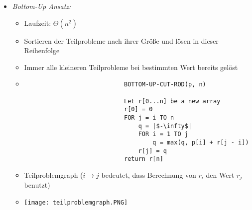\begin{itemize}
\begin{itemize}
\begin{itemize}
\begin{verbatim}
                            MEMOIZED-CUT-ROD-AUX(p, n, r)       // r new Array

                            IF r[n] |$\geq$| 0                        // Abfrage ob vorhanden
                                return r[n]
                            IF n == 0
                                q = 0
                            ELSE
                                q = |$-\infty$|
                                FOR i = 1 to n
                                q = max(q, p[i] + MEMOIZED-CUT-ROD-AUX(p, n - i, r))
                            r[n] = q                            // Abspeichern
                            return q
                            \end{verbatim}
                    \end{itemize}
                \item \textit{Bottom-Up Ansatz:}
                    \begin{itemize}
                        \item Laufzeit: $\Theta(n^2)$
                        \item Sortieren der Teilprobleme nach ihrer Grö\ss e und lösen in dieser Reihenfolge
                        \item Immer alle kleineren Teilprobleme bei bestimmten Wert bereits gelöst
                        \item[]
                            \begin{verbatim}
                            BOTTOM-UP-CUT-ROD(p, n)

                            Let r[0...n] be a new array
                            r[0] = 0
                            FOR j = i TO n
                                q = |$-\infty$|
                                FOR i = 1 TO j
                                    q = max(q, p[i] + r[j - i])
                                r[j] = q
                            return r[n]
                            \end{verbatim}
                        \item Teilproblemgraph ($i \rightarrow j$ bedeutet, dass Berechnung von $r_i$ den Wert $r_j$ benutzt)
                        \item[] \texttt{[image: teilproblemgraph.PNG]}
                    \end{itemize}
            \end{itemize}


\end{itemize}

